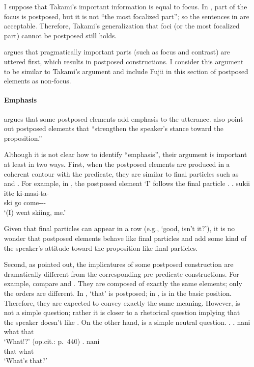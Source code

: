 I suppose that Takami's important information is equal to focus.
In \Last, part of the focus is postposed,
but it is not ``the most focalized part'';
so the sentences in \Last are acceptable.
Therefore,
Takami's generalization that foci (or the most focalized part) cannot be postposed still holds.

 argues that pragmatically important parts (such as focus and contrast) are uttered first,
which results in postposed constructions.
I consider this argument to be similar to Takami's argument and
include Fujii in this section of postposed elements as non-focus.


\paragraph{Emphasis}

 argues that some postposed elements add emphasis to the utterance.
 also point out postposed elements that
``strengthen the speaker's stance toward the proposition.''

Although it is not clear how to identify ``emphasis'',
their argument is important at least in two ways.
First,
when the postposed elements are produced in a coherent contour with the predicate,
they are similar to final particles such as  and .
For example, in \Next,
the postposed element  `I' follows the final particle .
%
\exg. sukii itte ki-masi-ta-  \\
      ski go come---  \\
      `(I) went skiing, me.'
      \hfill{\cite[438]{onosuzuki92}}

Given that final particles can appear in a row (e.g.,  `good, isn't it?'),
it is no wonder that postposed elements behave like final particles
and add some kind of the speaker's attitude toward the proposition like final particles.

Second,
as  pointed out,
the implicatures of some postposed construction are dramatically different from the corresponding pre-predicate constructions.%
For example, compare \Next[a] and \Next[b].
They are composed of exactly the same elements;
only the orders are different.
In \Next[a],  `that' is postposed;
in \Next[b],  is in the basic position.
Therefore, they are expected to convey exactly the same meaning.
However, \Next[a] is not a simple question;
rather it is closer to a rhetorical question implying that the speaker doesn't like .
On the other hand, \Next[b] is a simple neutral question.
%
\ex.
 \ag. nani  \\
      what that \\
      `What!?'
      \hfill{(op.cit.: p.~440)}
 \bg.  nani \\
       that what \\
       `What's that?'


